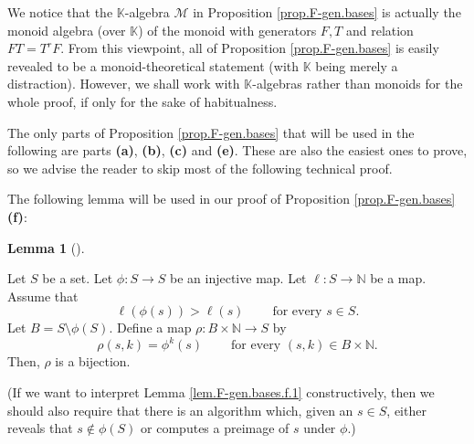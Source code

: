 \documentclass[numbers=enddot,12pt,final,onecolumn,notitlepage]{scrartcl}%
\theoremstyle{definition}
\newtheorem{lem}[theo]{Lemma}
\newenvironment{lemma}[1][]
{\begin{lem}[#1]\begin{leftbar}}
{\end{leftbar}\end{lem}}
\begin{document}
We notice that the $\mathbb{K}$-algebra $\mathcal{M}$ in Proposition
\ref{prop.F-gen.bases} is actually the monoid algebra (over $\mathbb{K}$) of
the monoid with generators $F,T$ and relation $FT=T^{r}F$. From this
viewpoint, all of Proposition \ref{prop.F-gen.bases} is easily revealed to be
a monoid-theoretical statement (with $\mathbb{K}$ being merely a distraction).
However, we shall work with $\mathbb{K}$-algebras rather than monoids for the
whole proof, if only for the sake of habitualness.

The only parts of Proposition \ref{prop.F-gen.bases} that will be used in the
following are parts \textbf{(a)}, \textbf{(b)}, \textbf{(c)} and \textbf{(e)}.
These are also the easiest ones to prove, so we advise the reader to skip most
of the following technical proof.

The following lemma will be used in our proof of Proposition
\ref{prop.F-gen.bases} \textbf{(f)}:

\begin{lemma}
\label{lem.F-gen.bases.f.1}Let $S$ be a set. Let $\phi:S\rightarrow S$ be an
injective map. Let $\ell:S\rightarrow\mathbb{N}$ be a map. Assume that%
\begin{equation}
\ell\left(  \phi\left(  s\right)  \right)  >\ell\left(  s\right)
\ \ \ \ \ \ \ \ \ \ \text{for every }s\in S.
\label{eq.lem.F-gen.bases.f.1.ass}%
\end{equation}
Let $B=S\setminus\phi\left(  S\right)  $. Define a map $\rho:B\times
\mathbb{N}\rightarrow S$ by%
\[
\rho\left(  s,k\right)  =\phi^{k}\left(  s\right)
\ \ \ \ \ \ \ \ \ \ \text{for every }\left(  s,k\right)  \in B\times
\mathbb{N}.
\]
Then, $\rho$ is a bijection.
\end{lemma}

(If we want to interpret Lemma \ref{lem.F-gen.bases.f.1} constructively, then
we should also require that there is an algorithm which, given an $s\in S$,
either reveals that $s\notin\phi\left(  S\right)  $ or computes a preimage of
$s$ under $\phi$.)
\end{document}
